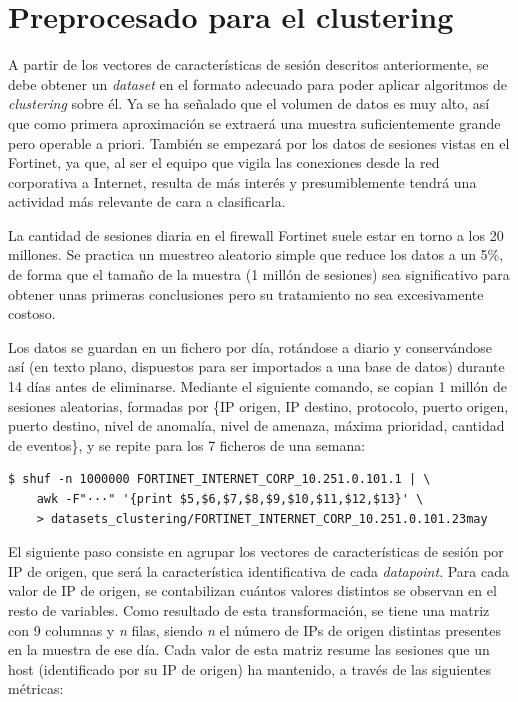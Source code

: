 \section{Preprocesado para el clustering}\label{sec:preprocesado}

A partir de los vectores de características de sesión descritos anteriormente, se debe obtener un \emph{dataset} en el formato adecuado para poder aplicar algoritmos de \emph{clustering} sobre él.
Ya se ha señalado que el volumen de datos es muy alto, así que como primera aproximación se extraerá una muestra suficientemente grande pero operable a priori.
También se empezará por los datos de sesiones vistas en el Fortinet, ya que, al ser el equipo que vigila las conexiones desde la red corporativa a Internet,
resulta de más interés y presumiblemente tendrá una actividad más relevante de cara a clasificarla.

La cantidad de sesiones diaria en el firewall Fortinet suele estar en torno a los 20 millones.
Se practica un muestreo aleatorio simple que reduce los datos a un 5\%,
de forma que el tamaño de la muestra (1 millón de sesiones) sea significativo para obtener unas primeras conclusiones pero su tratamiento no sea excesivamente costoso.

Los datos se guardan en un fichero por día, rotándose a diario y conservándose así (en texto plano, dispuestos para ser importados a una base de datos) durante 14 días antes de eliminarse.
Mediante el siguiente comando, se copian 1 millón de sesiones aleatorias, formadas por
\{IP origen, IP destino, protocolo, puerto origen, puerto destino, nivel de anomalía, nivel de amenaza, máxima prioridad, cantidad de eventos\},
y se repite para los 7 ficheros de una semana:

\begin{verbatim}
$ shuf -n 1000000 FORTINET_INTERNET_CORP_10.251.0.101.1 | \
    awk -F"···" '{print $5,$6,$7,$8,$9,$10,$11,$12,$13}' \
    > datasets_clustering/FORTINET_INTERNET_CORP_10.251.0.101.23may
\end{verbatim}

El siguiente paso consiste en agrupar los vectores de características de sesión por IP de origen, que será la característica identificativa de cada \emph{datapoint}.
Para cada valor de IP de origen, se contabilizan cuántos valores distintos se observan en el resto de variables.
Como resultado de esta transformación, se tiene una matriz con 9 columnas y \emph{n} filas, siendo \emph{n} el número de IPs de origen distintas presentes en la muestra de ese día.
Cada valor de esta matriz resume las sesiones que un host (identificado por su IP de origen) ha mantenido, a través de las siguientes métricas:

